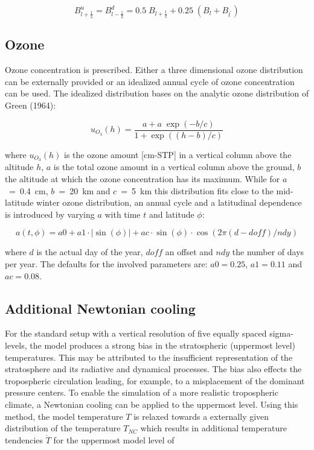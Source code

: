 \begin{equation}
B^u_{l+\frac{1}{2}}=B^d_{l-\frac{1}{2}}= 0.5 \;  B_{l+\frac{1}{2}} + 0.25 \; (B_{l} +
B_{l^{\prime}})
\end{equation}


\subsection{Ozone}

Ozone concentration is prescribed. Either a three dimensional ozone distribution can be
externally provided or an idealized annual cycle of ozone concentration can be used. The
idealized distribution bases on the analytic ozone distribution of Green (1964):

\begin{equation}
u_{O_3}(h)=\frac{a+a \; \exp{(-b/c)}}{1+\exp((h-b)/c)}
\end{equation}

where $u_{O_3}(h)$ is the ozone amount [cm-STP] in a vertical column above the altitude $h$,
$a$ is the total ozone amount in a vertical column above the ground, $b$ the altitude at which
the ozone concentration has its maximum. While for $a$~=~0.4~cm, $b$~=~20~km and
$c$~=~5~km
this distribution fits close to the mid-latitude winter ozone distribution, an annual cycle and a
latitudinal dependence is introduced by varying $a$ with time $t$ and latitude $\phi$:

\begin{equation}
a(t,\phi)=a0+a1\cdot|\sin(\phi)|+ac\cdot \sin(\phi) \cdot \cos(2\pi(d-doff)/ndy)
\end{equation}

where $d$ is the actual day of the year, $doff$ an offset and $ndy$ the number of days per year. The defaults for the involved parameters are: $a0=0.25$, $a1=0.11$ and $ac=0.08$.

\subsection{Additional Newtonian cooling}   

For the standard setup with a vertical resolution of five equally spaced sigma-levels, the model
produces a strong bias in the stratospheric (uppermost level) temperatures. This may be
attributed to the insufficient representation of the stratosphere and its radiative and dynamical
processes. The bias also effects the tropospheric circulation leading, for example, to a
misplacement of the dominant pressure centers. To enable the simulation of a more realistic
tropospheric climate, a Newtonian cooling can be applied to the uppermost level. Using this
method, the model temperature $T$ is relaxed towards a externally given distribution of  the
temperature $T_{NC}$ which results in additional temperature tendencies $\dot{T}$ for the
uppermost model level of

